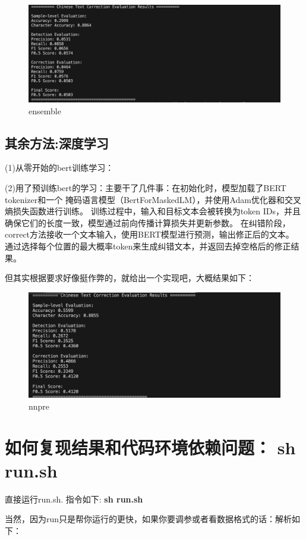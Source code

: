 \documentclass[answers]{exam}  %
\begin{document}
\begin{figure}[H]
    \centering
    \label{ensemble}
    \includegraphics[width=.6\textwidth]{../pic/ensemble.png} 
    \caption{ensemble}  
\end{figure}



\subsection{其余方法:深度学习}
\medskip
(1)从零开始的bert训练学习：

\medskip
(2)用了预训练bert的学习：主要干了几件事：在初始化时，模型加载了BERT tokenizer和一个
掩码语言模型（BertForMaskedLM），并使用Adam优化器和交叉熵损失函数进行训练。
训练过程中，输入和目标文本会被转换为token IDs，并且确保它们的长度一致，模型通过前向传播计算损失并更新参数。
在纠错阶段，correct方法接收一个文本输入，使用BERT模型进行预测，输出修正后的文本。
通过选择每个位置的最大概率token来生成纠错文本，并返回去掉空格后的修正结果。

但其实根据要求好像挺作弊的，就给出一个实现吧，大概结果如下：

\begin{figure}[H]
    \centering
    \label{nnpre}
    \includegraphics[width=.6\textwidth]{../pic/nnpre.png} 
    \caption{nnpre}  
\end{figure}



\section{如何复现结果和代码环境依赖问题： sh run.sh}

直接运行run.sh. 指令如下:
\textbf{sh run.sh}

当然，因为run只是帮你运行的更快，如果你要调参或者看数据格式的话：解析如下：
\end{document}
